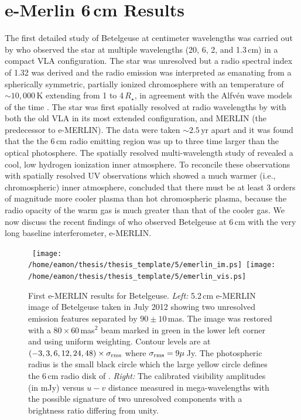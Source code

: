\section{e-Merlin 6\,cm Results}\label{sec:5.12}
The first detailed study of Betelgeuse at centimeter wavelengths was carried out by \cite{newell_1982}
who observed the star at multiple wavelengths (20, 6, 2, and 1.3\,cm) in a compact VLA configuration. The star was unresolved but a radio spectral index of 1.32 was derived and the radio emission was interpreted as emanating from a spherically symmetric, partially ionized chromosphere with an temperature of  $\sim 10,000$\,K extending from 1 to 4\,$R_{\star}$, in agreement with the Alfv\'en wave models of the time \citep{hartmann_1984}. The star was first spatially resolved at radio wavelengths by \cite{skinner_1997} with both the old VLA in its most extended configuration, and MERLIN (the predecessor to e-MERLIN). The data were taken $\sim 2.5$\,yr apart and it was found that the the 6\,cm radio emitting region was up to three time larger than the optical photosphere. The spatially resolved multi-wavelength study of \cite{lim_1998} revealed a cool, low hydrogen ionization inner atmosphere. To reconcile these observations with spatially resolved UV observations which showed a much warmer (i.e., chromospheric) inner atmosphere, \cite{lim_1998} concluded that there must be at least 3 orders of magnitude more cooler plasma than hot chromospheric plasma, because the radio opacity of the warm gas is much greater than that of the cooler gas. We now discuss the recent findings of \cite{richards_2013} who observed Betelgeuse at 6\,cm with the very long baseline interferometer, e-MERLIN.

\begin{figure}[!ht]
\centering 
\mbox{
          \texttt{[image: /home/eamon/thesis/thesis\_template/5/emerlin\_im.ps]}
          \texttt{[image: /home/eamon/thesis/thesis\_template/5/emerlin\_vis.ps]}
          }
\caption[First e-MERLIN results for Betelgeuse.]{First e-MERLIN results for Betelgeuse. \textit{Left:} 5.2\,cm e-MERLIN image of Betelgeuse taken in July 2012 showing two unresolved emission features separated by $90\pm10$\,mas. The image was restored with a $80\times 60$\,mas$^2$ beam marked in green in the lower left corner and using uniform weighting. Contour levels are at $(-3, 3, 6, 12, 24, 48)\times \sigma _{\rm{rms}}$ where $\sigma _{\rm{rms}} = 9\mu$\,Jy. The photospheric radius is the small black circle which the large yellow circle defines the 6\,cm radio disk of \cite{lim_1998}. \textit{Right:} The calibrated visibility amplitudes (in mJy) versus $u-v$ distance measured in mega-wavelengths with the possible signature of two unresolved components with a brightness ratio differing from unity. }
\label{fig:5.13}
\end{figure}

